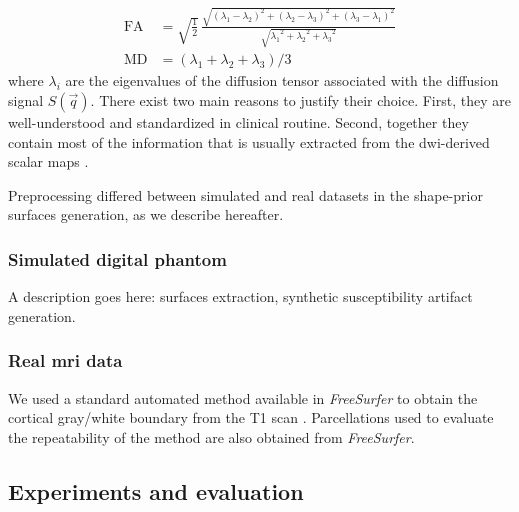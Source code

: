\begin{align}
\mathrm{FA} &= \sqrt{ \frac{1}{2}}\,\frac{\sqrt{ (\lambda_1 - \lambda_2)^2 + (\lambda_2 - \lambda_3)^2 + (\lambda_3 - \lambda_1)^2}}{\sqrt{ {\lambda_1}^2 + {\lambda_2}^2 + {\lambda_3}^2}} \label{eq:fa} \\
\mathrm{MD} &= ( \lambda_1 + \lambda_2 + \lambda_3 ) / 3 \label{eq:md}
\end{align}
where $\lambda_i$ are the eigenvalues of the diffusion tensor 
associated with the diffusion signal $S(\vec{q})$. There exist 
two main reasons to justify their choice. 
First, they are well-understood and standardized in clinical routine.
Second, together they contain most of the information that is
usually extracted from the \gls{dwi}-derived scalar maps
\cite{ennis_orthogonal_2006}.


Preprocessing differed between simulated and real datasets in the 
shape-prior surfaces generation, as we describe hereafter.


\subsubsection{Simulated digital phantom} %
A description goes here: surfaces extraction, synthetic susceptibility artifact generation.

\subsubsection {Real \gls{mri} data} %

We used a standard automated method 
available in \emph{FreeSurfer} \citep{fischl_freesurfer_2012} to obtain the
cortical gray/white boundary from the T1 scan \citep{greve_accurate_2009}.
Parcellations used to evaluate the repeatability of the method are also
obtained from \emph{FreeSurfer}.


\subsection{Experiments and evaluation}
\label{sec:experiments_evaluation}
%
